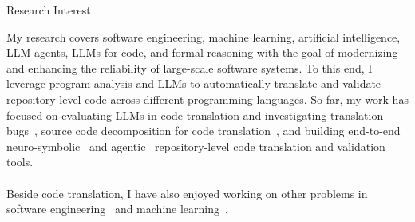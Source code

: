 \begin{rubric}{Research Interest}
\begin{minipage}{\linewidth}
{\large My research covers software engineering, machine learning, artificial intelligence, LLM agents, LLMs for code, and formal reasoning with the goal of modernizing and enhancing the reliability of large-scale software systems. To this end, I leverage program analysis and LLMs to automatically translate and validate repository-level code across different programming languages. So far, my work has focused on evaluating LLMs in code translation and investigating translation bugs~\cite{pan2024lost}, source code decomposition for code translation~\cite{ibrahimzada2024program}, and building end-to-end neuro-symbolic~\cite{ibrahimzada2025alphatrans} and agentic~\cite{ibrahimzada2026recodeagent} repository-level code translation and validation~\cite{ibrahimzada2026matchfixagent,ke2027mockingbird} tools. 
\\\\
Beside code translation, I have also enjoyed working on other problems in software engineering~\cite{ibrahimzada2025challenging,ibrahimzada2022perfect} and machine learning~\cite{ibrahimzada2026predicting,cakmak2023predicting,sohsah2020scalable}. }
\end{minipage}
\end{rubric}
